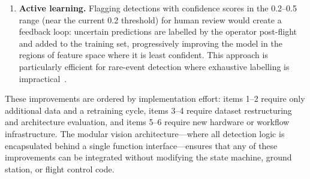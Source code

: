 \begin{enumerate}
    \item \textbf{Active learning.}  Flagging detections with confidence scores in the 0.2--0.5 range (near the current 0.2 threshold) for human review would create a feedback loop: uncertain predictions are labelled by the operator post-flight and added to the training set, progressively improving the model in the regions of feature space where it is least confident.  This approach is particularly efficient for rare-event detection where exhaustive labelling is impractical~\cite{settles2009active}.
\end{enumerate}

These improvements are ordered by implementation effort: items 1--2 require only additional data and a retraining cycle, items 3--4 require dataset restructuring and architecture evaluation, and items 5--6 require new hardware or workflow infrastructure.  The modular vision architecture---where all detection logic is encapsulated behind a single function interface---ensures that any of these improvements can be integrated without modifying the state machine, ground station, or flight control code.
